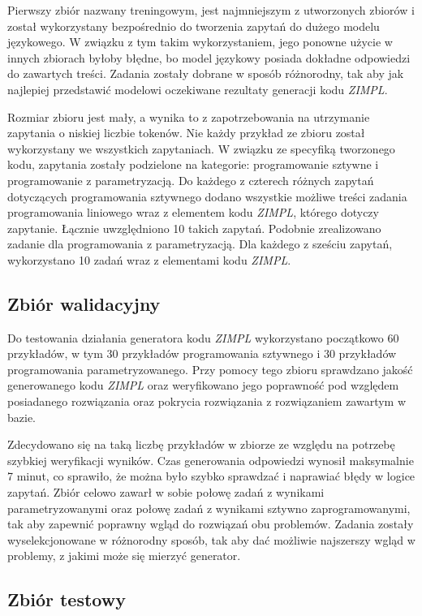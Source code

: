 Pierwszy zbiór nazwany treningowym, jest najmniejszym z utworzonych zbiorów i został wykorzystany bezpośrednio do tworzenia zapytań do dużego modelu językowego. W związku z tym takim wykorzystaniem, jego ponowne użycie w innych zbiorach byłoby błędne, bo model językowy posiada dokładne odpowiedzi do zawartych treści. Zadania zostały dobrane w sposób różnorodny, tak aby jak najlepiej przedstawić modelowi oczekiwane rezultaty generacji kodu  \textit{ZIMPL}. 

Rozmiar zbioru jest mały, a wynika to z zapotrzebowania na utrzymanie zapytania o niskiej liczbie tokenów. Nie każdy przykład ze zbioru został wykorzystany we wszystkich zapytaniach. W związku ze specyfiką tworzonego kodu, zapytania zostały podzielone na kategorie: programowanie sztywne i programowanie z parametryzacją. Do każdego z czterech różnych zapytań dotyczących programowania sztywnego dodano wszystkie możliwe treści zadania programowania liniowego wraz z elementem kodu  \textit{ZIMPL}, którego dotyczy zapytanie. Łącznie uwzględniono 10 takich zapytań. Podobnie zrealizowano zadanie dla programowania z parametryzacją. Dla każdego z sześciu zapytań, wykorzystano 10 zadań wraz z elementami kodu  \textit{ZIMPL}.

\subsection{Zbiór walidacyjny}

Do testowania działania generatora kodu  \textit{ZIMPL} wykorzystano początkowo 60 przykładów, w tym 30 przykładów programowania sztywnego i 30 przykładów programowania parametryzowanego. Przy pomocy tego zbioru sprawdzano jakość generowanego kodu  \textit{ZIMPL} oraz weryfikowano jego poprawność pod względem posiadanego rozwiązania oraz pokrycia rozwiązania z rozwiązaniem zawartym w bazie.

Zdecydowano się na taką liczbę przykładów w zbiorze ze względu na potrzebę szybkiej weryfikacji wyników. Czas generowania odpowiedzi wynosił maksymalnie 7 minut, co sprawiło, że można było szybko sprawdzać i naprawiać błędy w logice zapytań. Zbiór celowo zawarł w sobie połowę zadań z wynikami parametryzowanymi oraz połowę zadań z wynikami sztywno zaprogramowanymi, tak aby zapewnić poprawny wgląd do rozwiązań obu problemów. Zadania zostały wyselekcjonowane w różnorodny sposób, tak aby dać możliwie najszerszy wgląd w problemy, z jakimi może się mierzyć generator.

\subsection{Zbiór testowy}

